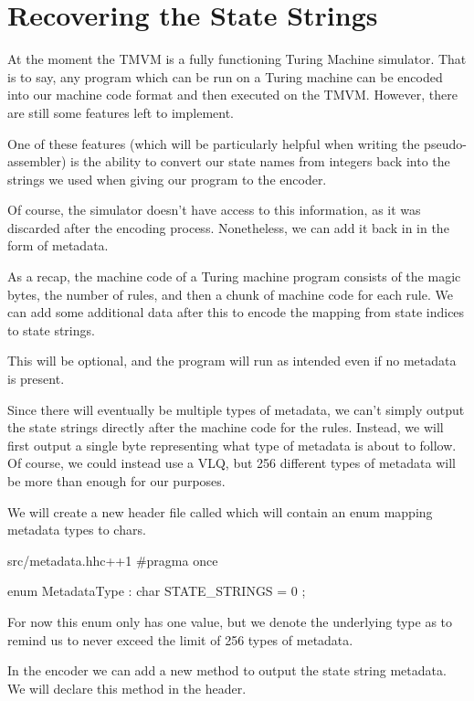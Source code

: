 \section{Recovering the State Strings}

At the moment the TMVM is a fully functioning Turing Machine simulator. That is to say, any program which can be run on a Turing machine can be encoded into our machine code format and then executed on the TMVM. However, there are still some features left to implement.

One of these features (which will be particularly helpful when writing the pseudo-assembler) is the ability to convert our state names from integers back into the strings we used when giving our program to the encoder.

Of course, the simulator doesn't have access to this information, as it was discarded after the encoding process. Nonetheless, we can add it back in in the form of metadata.

As a recap, the machine code of a Turing machine program consists of the magic bytes, the number of rules, and then a chunk of machine code for each rule. We can add some additional data after this to encode the mapping from state indices to state strings.

This will be optional, and the program will run as intended even if no metadata is present.

Since there will eventually be multiple types of metadata, we can't simply output the state strings directly after the machine code for the rules. Instead, we will first output a single byte representing what type of metadata is about to follow. Of course, we could instead use a VLQ, but 256 different types of metadata will be more than enough for our purposes.

We will create a new header file called  which will contain an enum mapping metadata types to chars.

\begin{file}{src/metadata.hh}{c++}{1}
#pragma once

enum MetadataType : char
{
    STATE_STRINGS = 0
};
\end{file}

For now this enum only has one value, but we denote the underlying type as  to remind us to never exceed the limit of 256 types of metadata.

In the encoder we can add a new method to output the state string metadata. We will declare this method in the  header.

